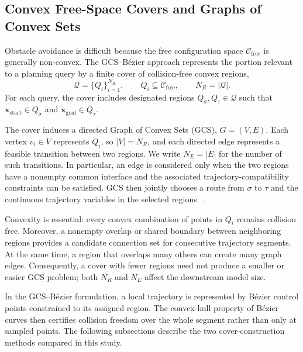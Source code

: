 \raggedbottom
\subsection{Convex Free-Space Covers and Graphs of Convex Sets}
\label{sec:convex-free-space}

Obstacle avoidance is difficult because the free configuration space
$\mathcal{C}_{\mathrm{free}}$ is generally non-convex.  The GCS--B\'ezier
approach represents the portion relevant to a planning query by a finite cover
of collision-free convex regions,
\begin{equation}
  \mathcal{Q}=\{Q_i\}_{i=1}^{N_R},\qquad
  Q_i\subseteq\mathcal{C}_{\mathrm{free}},\qquad
  N_R=|\mathcal{Q}|.
  \label{eq:convex-cover}
\end{equation}
For each query, the cover includes designated regions
$Q_\sigma,Q_\tau\in\mathcal{Q}$ such that
$\mathbf{x}_{\mathrm{start}}\in Q_\sigma$ and
$\mathbf{x}_{\mathrm{goal}}\in Q_\tau$.

The cover induces a directed Graph of Convex Sets (GCS),
$G=(V,E)$.  Each vertex $v_i\in V$ represents $Q_i$, so
$|V|=N_R$, and each directed edge represents a feasible transition between
two regions.  We write $N_E=|E|$ for the number of such transitions.  In
particular, an edge is considered only when the two regions have a nonempty
common interface and the associated trajectory-compatibility constraints can
be satisfied.  GCS then jointly chooses a route from $\sigma$ to $\tau$ and
the continuous trajectory variables in the selected regions
~\cite{MarcucciEtAl2023GCS,MarcucciEtAl2023MotionPlanning}.

Convexity is essential: every convex combination of points in $Q_i$ remains
collision free.  Moreover, a nonempty overlap or shared boundary between
neighboring regions provides a candidate connection set for consecutive
trajectory segments.  At the same time, a region that overlaps many others can
create many graph edges.  Consequently, a cover with fewer regions need not
produce a smaller or easier GCS problem; both $N_R$ and $N_E$ affect the
downstream model size.

In the GCS--B\'ezier formulation, a local trajectory is represented by
B\'ezier control points constrained to its assigned region.  The convex-hull
property of B\'ezier curves then certifies collision freedom over the whole
segment rather than only at sampled points.  The following subsections describe
the two cover-construction methods compared in this study.

